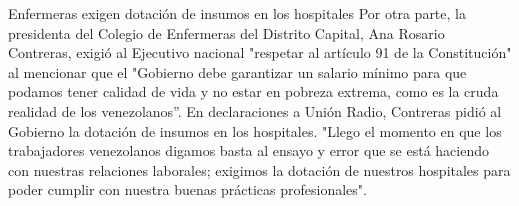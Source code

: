 \documentclass{article}%
\begin{document}
\newline%
%
Enfermeras exigen dotación de insumos en los hospitales%
\newline%
%
Por otra parte, la presidenta del Colegio de Enfermeras del Distrito Capital, Ana Rosario Contreras, exigió al Ejecutivo nacional "respetar al artículo 91 de la Constitución" al mencionar que el "Gobierno debe garantizar un salario mínimo para que podamos tener calidad de vida y no estar en pobreza extrema, como es la cruda realidad de los venezolanos”.%
\newline%
%
En declaraciones a Unión Radio, Contreras pidió al Gobierno la dotación de insumos en los hospitales. "Llego el momento en que los trabajadores venezolanos digamos basta al ensayo y error que se está haciendo con nuestras relaciones laborales; exigimos la dotación de nuestros hospitales para poder cumplir con nuestra buenas prácticas profesionales".%
\newline%
%
\end{document}

